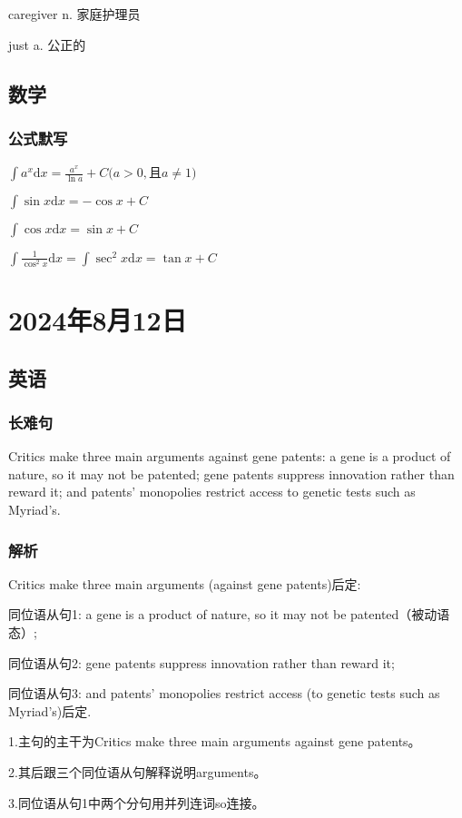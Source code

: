 \documentclass[UTF8]{ctexart}
\begin{document}
caregiver n. 家庭护理员

just a. 公正的
\subsection{数学}
\subsubsection{公式默写}
\begin{multicols}{2}
      $\int a^x\mathrm{d}x=\frac{a^x}{\ln a}+C(a>0,$且$a\ne1)$

      $\int\sin x\mathrm{d}x=-\cos x+C$

      $\int\cos x\mathrm{d}x=\sin x+C$

      $\int\frac{1}{\cos^2x}\mathrm{d}x=\int\sec^2x\mathrm{d}x=\tan x+C$
\end{multicols}
\section{2024年8月12日}
\subsection{英语}
\subsubsection{长难句}
Critics make three main arguments against gene patents: a gene is a product of nature, so it may not be patented; gene patents suppress innovation rather than reward it; and patents' monopolies restrict access to genetic tests such as Myriad's.
\subsubsection{解析}
Critics make three main arguments (against gene patents)后定:

同位语从句1: a gene is a product of nature, so it may not be patented（被动语态）;

同位语从句2: gene patents suppress innovation rather than reward it;

同位语从句3: and patents' monopolies restrict access (to genetic tests such as Myriad's)后定.

1.主句的主干为Critics make three main arguments against gene patents。

2.其后跟三个同位语从句解释说明arguments。

3.同位语从句1中两个分句用并列连词so连接。
\end{document}
